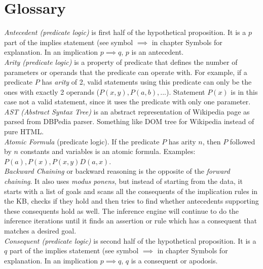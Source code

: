 % 
\chapter{Glossary}
\emph{Antecedent (predicate logic)} is first half of the hypothetical 
proposition. It is a $p$ part of the implies statement (see symbol $\implies$ in
chapter Symbols for explanation. In an implication $p \implies q$, $p$ is an
antecedent.\\

\emph{Arity (predicate logic)} is a property of predicate that defines the 
number of parameters or operands that the predicate can operate with. For example,
if a predicate $P$ has \emph{arity} of 2, valid statements using this predicate
can only be the ones with exactly 2 operands ($P(x,y), P(a,b),...$). Statement
$P(x)$ is in this case not a valid statement, since it uses the predicate with
only one parameter.\\

\emph{AST (Abstract Syntax Tree)} is an abstract representation of Wikipedia 
page as parsed from DBPedia parser. Something like DOM tree for Wikipedia 
instead of pure HTML.\\

\emph{Atomic Formula} (predicate logic). If the predicate $P$ has arity $n$,
then $P$ followed by $n$ constants and variables is an atomic formula. Examples:
$P(a), P(x), P(x,y) D(a,x)$.\\

\emph{Backward Chaining} or backward reasoning is the opposite of the 
\emph{forward chaining}. It also uses \emph{modus ponens}, but instead of 
starting from the data, it starts with a list of goals and scans all the 
consequents of the implication rules in the KB, checks if they hold and then
tries to find whether antecedents supporting these consequents hold as well.
The inference engine will continue to do the inference iterations until it finds an assertion or rule which has a consequent that matches a desired goal.\\

\emph{Consequent (predicate logic)} is second half of the hypothetical 
proposition. It is a $q$ part of the implies statement (see symbol $\implies$ in
chapter Symbols for explanation. In an implication $p \implies q$, $q$ is a
consequent or apodosis.\\

